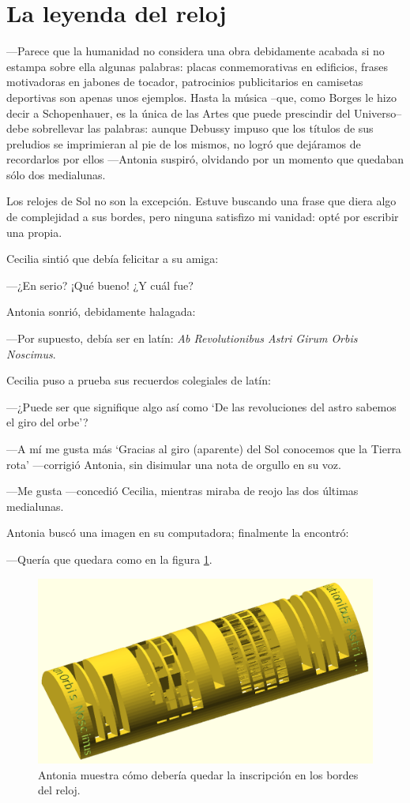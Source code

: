 \section{La leyenda del reloj}

---Parece que la humanidad no considera una obra debidamente acabada
si no estampa sobre ella algunas palabras: placas conmemorativas en
edificios, frases motivadoras en jabones de tocador, patrocinios
publicitarios en camisetas deportivas son apenas unos ejemplos. Hasta
la música --que, como Borges le hizo decir a Schopenhauer, es la
única de las Artes que puede prescindir del Universo-- debe
sobrellevar las palabras: aunque Debussy impuso que los títulos de sus
preludios se imprimieran al pie de los mismos, no logró que dejáramos
de recordarlos por ellos ---Antonia suspiró, olvidando por un momento
que quedaban sólo dos medialunas.

\guillemotright Los relojes de Sol no son la excepción. Estuve
buscando una frase que diera algo de complejidad a sus bordes, pero
ninguna satisfizo mi vanidad: opté por escribir una propia.

Cecilia sintió que debía felicitar a su amiga:

---¿En serio?  ¡Qué bueno! ¿Y cuál fue?

Antonia sonrió, debidamente halagada:

---Por supuesto, debía ser en latín: \emph{Ab Revolutionibus Astri
  Girum Orbis Noscimus}.

Cecilia puso a prueba sus recuerdos colegiales de latín:

---¿Puede ser que signifique algo así como `De las revoluciones del
astro sabemos el giro del orbe'?

---A mí me gusta más `Gracias al giro (aparente) del Sol conocemos que
la Tierra rota' ---corrigió Antonia, sin disimular una nota de orgullo
en su voz.

---Me gusta ---concedió Cecilia, mientras miraba de reojo las dos
últimas medialunas.

Antonia buscó una imagen en su computadora; finalmente la encontró:

---Quería que quedara como en la figura \ref{fig:leyenda-1}.


\begin{figure}[ht]
  \centering
  \includegraphics[width=1\textwidth]{imagenes/leyenda-1}  
  \caption{Antonia muestra cómo debería quedar la inscripción en los
    bordes del reloj.}
  \label{fig:leyenda-1}
\end{figure}


